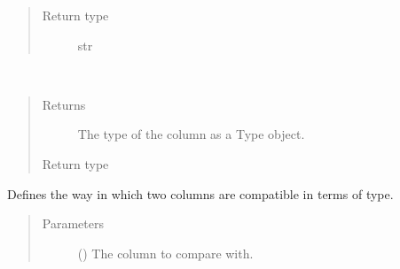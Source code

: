 \documentclass[letterpaper,10pt,english]{sphinxmanual}
\begin{document}
\begin{fulllineitems}
\begin{fulllineitems}
\begin{quote}
\begin{description}
\item[{Return type}] \leavevmode
\sphinxAtStartPar
str

\end{description}\end{quote}

\end{fulllineitems}


\begin{fulllineitems}
\label{\detokenize{model:simple_sql.model.column.Column.get_type}}~\begin{quote}\begin{description}
\item[{Returns}] \leavevmode
\sphinxAtStartPar
The type of the column as a Type object.

\item[{Return type}] \leavevmode
\sphinxAtStartPar
{\hyperref[\detokenize{model:simple_sql.model.type.Type}]{}}

\end{description}\end{quote}

\end{fulllineitems}


\begin{fulllineitems}
\label{\detokenize{model:simple_sql.model.column.Column.is_compatible}}
\sphinxAtStartPar
Defines the way in which two columns are compatible
in terms of type.
\begin{quote}\begin{description}
\item[{Parameters}] \leavevmode
\sphinxAtStartPar
{} ({\hyperref[\detokenize{model:simple_sql.model.column.Column}]{}}) \textendash{} The column to compare with.


\end{description}
\end{quote}
\end{fulllineitems}
\end{fulllineitems}
\end{document}

